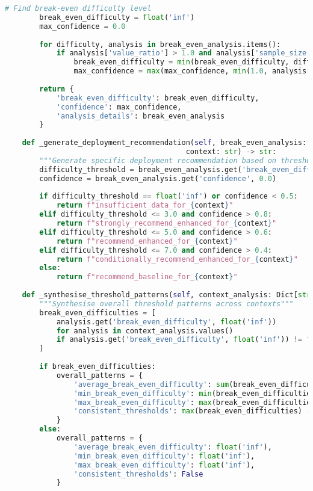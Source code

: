 \begin{lstlisting}[language=Python, caption=Cost-Benefit Threshold Analysis for Deployment Guidance]
        # Find break-even difficulty level
        break_even_difficulty = float('inf')
        max_confidence = 0.0
        
        for difficulty, analysis in break_even_analysis.items():
            if analysis['value_ratio'] > 1.0 and analysis['sample_size'] >= 5:
                break_even_difficulty = min(break_even_difficulty, difficulty)
                max_confidence = max(max_confidence, min(1.0, analysis['sample_size'] / 10.0))
        
        return {
            'break_even_difficulty': break_even_difficulty,
            'confidence': max_confidence,
            'analysis_details': break_even_analysis
        }
    
    def _generate_deployment_recommendation(self, break_even_analysis: Dict[str, Any], 
                                          context: str) -> str:
        """Generate specific deployment recommendation based on threshold analysis"""
        difficulty_threshold = break_even_analysis.get('break_even_difficulty', float('inf'))
        confidence = break_even_analysis.get('confidence', 0.0)
        
        if difficulty_threshold == float('inf') or confidence < 0.5:
            return f"insufficient_data_for_{context}"
        elif difficulty_threshold <= 3.0 and confidence > 0.8:
            return f"strongly_recommend_enhanced_for_{context}"
        elif difficulty_threshold <= 5.0 and confidence > 0.6:
            return f"recommend_enhanced_for_{context}"
        elif difficulty_threshold <= 7.0 and confidence > 0.4:
            return f"conditionally_recommend_enhanced_for_{context}"
        else:
            return f"recommend_baseline_for_{context}"
    
    def _synthesise_threshold_patterns(self, context_analysis: Dict[str, Dict]) -> Dict[str, Any]:
        """Synthesise overall threshold patterns across contexts"""
        break_even_difficulties = [
            analysis.get('break_even_difficulty', float('inf'))
            for analysis in context_analysis.values()
            if analysis.get('break_even_difficulty', float('inf')) != float('inf')
        ]
        
        if break_even_difficulties:
            overall_patterns = {
                'average_break_even_difficulty': sum(break_even_difficulties) / len(break_even_difficulties),
                'min_break_even_difficulty': min(break_even_difficulties),
                'max_break_even_difficulty': max(break_even_difficulties),
                'consistent_thresholds': max(break_even_difficulties) - min(break_even_difficulties) < 2.0
            }
        else:
            overall_patterns = {
                'average_break_even_difficulty': float('inf'),
                'min_break_even_difficulty': float('inf'),
                'max_break_even_difficulty': float('inf'),
                'consistent_thresholds': False
            }
        

\end{lstlisting}
